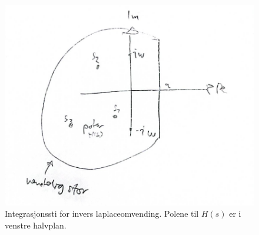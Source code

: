 \documentclass{article}
\begin{document}
\begin{figure}
        \centering
        \includegraphics[width=\linewidth]{images/freqresp.png}
        \caption{Integrasjonssti for invers laplaceomvending. Polene til $H(s)$ er i venstre halvplan.}
        \label{fig:freqresp}
\end{figure} 
\end{document}
